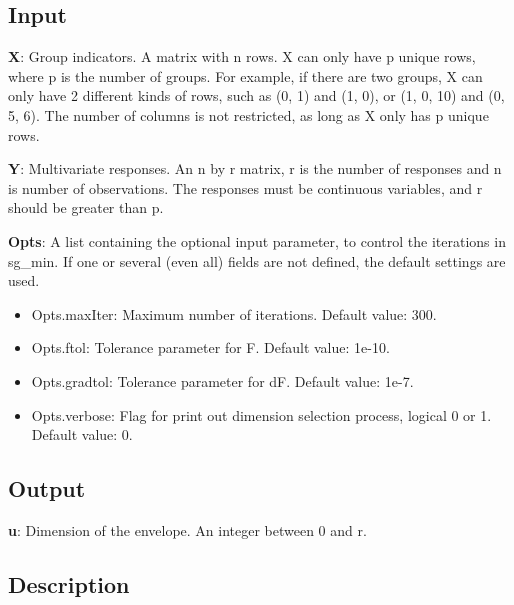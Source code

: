 \documentclass[a4paper,11pt,openany]{memoir}
\begin{document}
\subsection*{Input}

\begin{par}
\textbf{X}: Group indicators. A matrix with n rows.  X can only have p unique  rows, where p is the number of groups. For example, if there are two groups, X can only have 2 different kinds of rows, such as (0, 1) and (1, 0), or (1, 0, 10) and (0, 5, 6).  The number of columns is not restricted, as long as X only has p unique rows.
\end{par} \vspace{1em}
\begin{par}
\textbf{Y}: Multivariate responses. An n by r matrix, r is the number of responses and n is number of observations. The responses must be continuous variables, and r should be greater than p.
\end{par} \vspace{1em}
\begin{par}
\textbf{Opts}: A list containing the optional input parameter, to control the iterations in sg\_min. If one or several (even all) fields are not defined, the default settings are used.
\end{par} \vspace{1em}
\begin{itemize}
\setlength{\itemsep}{-1ex}
   \item Opts.maxIter: Maximum number of iterations.  Default value: 300.
   \item Opts.ftol: Tolerance parameter for F.  Default value: 1e-10.
   \item Opts.gradtol: Tolerance parameter for dF.  Default value: 1e-7.
   \item Opts.verbose: Flag for print out dimension selection process, logical 0 or 1. Default value: 0.
\end{itemize}


\subsection*{Output}

\begin{par}
\textbf{u}: Dimension of the envelope. An integer between 0 and r.
\end{par} \vspace{1em}


\subsection*{Description}
\end{document}
